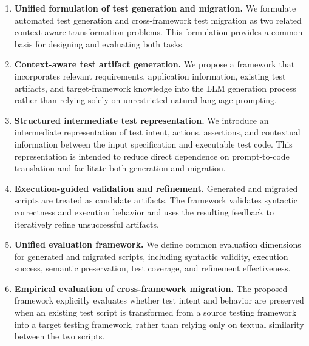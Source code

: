\documentclass[pdflatex,sn-mathphys-num]{sn-jnl}
\begin{document}
\begin{enumerate}[leftmargin=*]

    \item \textbf{Unified formulation of test generation and migration.}
    We formulate automated test generation and cross-framework test
    migration as two related context-aware transformation problems. This
    formulation provides a common basis for designing and evaluating both
    tasks.

    \item \textbf{Context-aware test artifact generation.}
    We propose a framework that incorporates relevant requirements,
    application information, existing test artifacts, and target-framework
    knowledge into the LLM generation process rather than relying solely
    on unrestricted natural-language prompting.

    \item \textbf{Structured intermediate test representation.}
    We introduce an intermediate representation of test intent, actions,
    assertions, and contextual information between the input specification
    and executable test code. This representation is intended to reduce
    direct dependence on prompt-to-code translation and facilitate both
    generation and migration.

    \item \textbf{Execution-guided validation and refinement.}
    Generated and migrated scripts are treated as candidate artifacts.
    The framework validates syntactic correctness and execution behavior
    and uses the resulting feedback to iteratively refine unsuccessful
    artifacts.

    \item \textbf{Unified evaluation framework.}
    We define common evaluation dimensions for generated and migrated
    scripts, including syntactic validity, execution success, semantic
    preservation, test coverage, and refinement effectiveness.

    \item \textbf{Empirical evaluation of cross-framework migration.}
    The proposed framework explicitly evaluates whether test intent and
    behavior are preserved when an existing test script is transformed
    from a source testing framework into a target testing framework,
    rather than relying only on textual similarity between the two
    scripts.

\end{enumerate}
\end{document}
